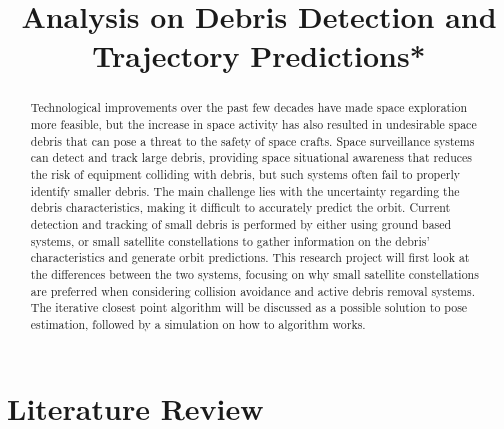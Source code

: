 \documentclass[conference]{IEEEtran}
\begin{document}
	
	\title{Analysis on Debris Detection and Trajectory Predictions*}

	\author{
	}

	\maketitle
	
	\begin{abstract}
		
		Technological improvements over the past few decades have made space exploration more feasible, but the increase in space activity has also resulted in undesirable space debris that can pose a threat to the safety of space crafts. 
		Space surveillance systems can detect and track large debris, providing space situational awareness that reduces the risk of equipment colliding with debris, but such systems often fail to properly identify smaller debris. The main challenge lies with the uncertainty regarding the debris characteristics, making it difficult to accurately predict the orbit.
		Current detection and tracking of small debris is performed by either using ground based systems, or small satellite constellations to gather information on the debris' characteristics and generate orbit predictions.
		This research project will first look at the differences between the two systems, focusing on why small satellite constellations are preferred when considering collision avoidance and active debris removal systems. The iterative closest point algorithm will be discussed as a possible solution to pose estimation, followed by a simulation on how to algorithm works.
		

	\end{abstract}

	\section{Literature Review}
	
\end{document}
